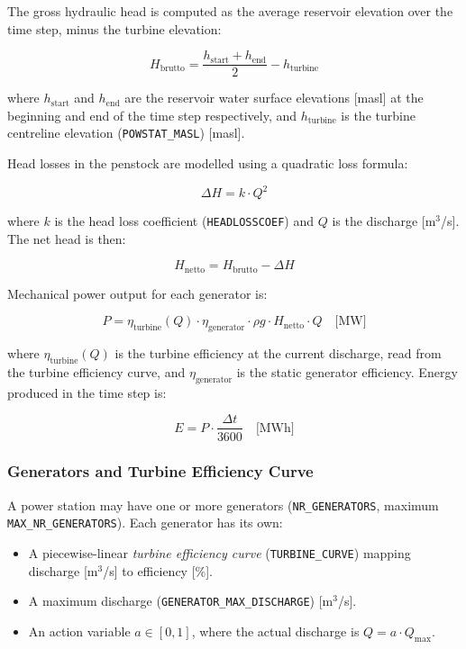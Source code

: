 \documentclass[a4paper, 12pt]{report}
\begin{document}
	The gross hydraulic head is computed as the average reservoir elevation over the time step,
	minus the turbine elevation:

	$$
		H_\mathrm{brutto} = \frac{h_\mathrm{start} + h_\mathrm{end}}{2} - h_\mathrm{turbine}
	$$

	where $h_\mathrm{start}$ and $h_\mathrm{end}$ are the reservoir water surface elevations
	[masl] at the beginning and end of the time step respectively, and $h_\mathrm{turbine}$ is
	the turbine centreline elevation (\texttt{POWSTAT\_MASL}) [masl].

	Head losses in the penstock are modelled using a quadratic loss formula:

	\begin{equation}
	    \Delta H = k \cdot Q^2
        \label{eq:Headloss}
	\end{equation}
	

	where $k$ is the head loss coefficient (\texttt{HEADLOSSCOEF}) and $Q$ is the discharge
	[m$^3$/s]. The net head is then:


	\begin{equation}
	    H_\mathrm{netto} = H_\mathrm{brutto} - \Delta H
        \label{eq:Head_net}
	\end{equation}

	Mechanical power output for each generator is:

	\begin{equation}
	    P = \eta_\mathrm{turbine}(Q) \cdot \eta_\mathrm{generator} \cdot \rho g \cdot H_\mathrm{netto} \cdot Q \quad \text{[MW]}
        \label{eq:Gen_Mech_power}
	\end{equation}
	

	where $\eta_\mathrm{turbine}(Q)$ is the turbine efficiency at the current discharge, read from
	the turbine efficiency curve, and $\eta_\mathrm{generator}$ is the static generator efficiency.
	Energy produced in the time step is:

	$$
	E = P \cdot \frac{\Delta t}{3600} \quad \text{[MWh]}
	$$


	\subsubsection{Generators and Turbine Efficiency Curve}
	A power station may have one or more generators (\texttt{NR\_GENERATORS}, maximum
	\texttt{MAX\_NR\_GENERATORS}). Each generator has its own:

	\begin{itemize}
		\item A piecewise-linear \emph{turbine efficiency curve} (\texttt{TURBINE\_CURVE})
		mapping discharge [m$^3$/s] to efficiency [\%].
		\item A maximum discharge (\texttt{GENERATOR\_MAX\_DISCHARGE}) [m$^3$/s].
		\item An action variable $a \in [0, 1]$, where the actual discharge is
		$Q = a \cdot Q_\mathrm{max}$.
	\end{itemize}
\end{document}
